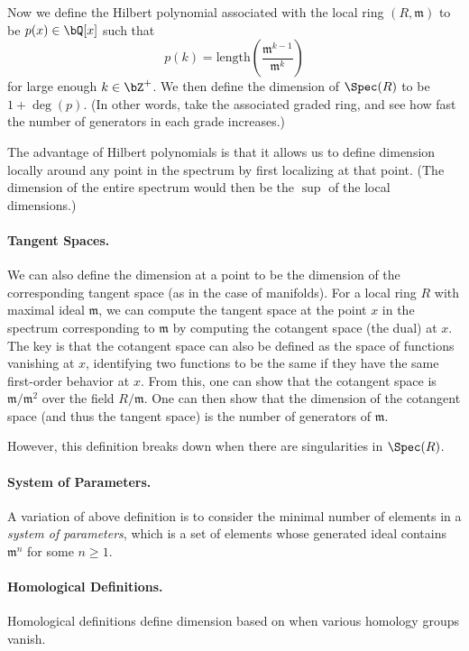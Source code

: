 Now we define the Hilbert polynomial associated with the local ring $(R, \mathfrak m)$ to be $p(x) \in \bQ[x]$ such that
\[
    p(k) = \text{length}\left( \frac{\mathfrak m^{k-1}}{\mathfrak m^k} \right)
\]
for large enough $k \in \bZ^+$. We then define the dimension of $\Spec(R)$ to be $1 + \deg(p)$. (In other words, take the associated graded ring, and see how fast the number of generators in each grade increases.)

The advantage of Hilbert polynomials is that it allows us to define dimension locally around any point in the spectrum by first localizing at that point. (The dimension of the entire spectrum would then be the $\sup$ of the local dimensions.)

\paragraph{Tangent Spaces.} We can also define the dimension at a point to be the dimension of the corresponding tangent space (as in the case of manifolds). For a local ring $R$ with maximal ideal $\mathfrak m$, we can compute the tangent space at the point $x$ in the spectrum corresponding to $\mathfrak m$ by computing the cotangent space (the dual) at $x$. The key is that the cotangent space can also be defined as the space of functions vanishing at $x$, identifying two functions to be the same if they have the same first-order behavior at $x$. From this, one can show that the cotangent space is $\mathfrak m/\mathfrak m^2$ over the field $R/\mathfrak m$. One can then show that the dimension of the cotangent space (and thus the tangent space) is the number of generators of $\mathfrak m$.

However, this definition breaks down when there are singularities in $\Spec(R)$.

\paragraph{System of Parameters.} A variation of above definition is to consider the minimal number of elements in a \textit{system of parameters}, which is a set of elements whose generated ideal contains $\mathfrak m^n$ for some $n \ge 1$.

\paragraph{Homological Definitions.} Homological definitions define dimension based on when various homology groups vanish.


